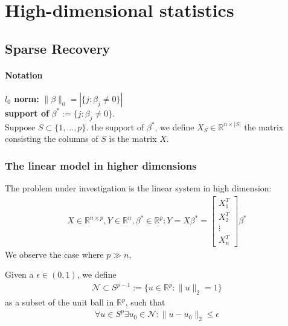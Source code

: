 \chapter{High-dimensional statistics}

\section{Sparse Recovery}
\subsubsection*{Notation}
\textbf{$l_0$ norm:} $	\|\beta\|_0 = |\{j: \beta_j \neq 0\}|$\\
\textbf{support of} $\beta^*:= \{j: \beta_j \neq 0\}$. \\
Suppose $S \subset \{1, \dots, p \}$. the support of $\beta^*$, we define $X_S \in \mathbb{R}^{n \times |S|}$ the matrix consisting the columns of $S$ is the matrix $X$.
\subsection{The linear model in higher dimensions}
The problem under investigation is the linear system in high dimension:
\begin{align*}
X \in \mathbb{R}^{n \times p}, Y \in \mathbb{R}^n, \beta^* \in \mathbb{R}^p: 
 Y = X \beta^* = 
 \begin{bmatrix}
 	X_1^T\\
 	X_2^T\\
 	\vdots\\
 	X_n^T
 \end{bmatrix}	\beta^*
\end{align*}
We observe the case where $p \gg n$, 


\begin{example}
\end{example}



\begin{definition}
Given a $\epsilon \in (0, 1)$, we define
	\begin{align*}
		\mathcal{N} \subset S^{p-1} := \{u \in \mathbb{R}^p: \|u\|_2 = 1\}
	\end{align*}
	as a subset of the unit ball in $\mathbb{R}^p$, such that
	\begin{align*}
		\forall u \in S^p \exists u_0 \in \mathcal{N}: \|u- u_0\|_2 \leq \epsilon
	\end{align*}
\end{definition}





